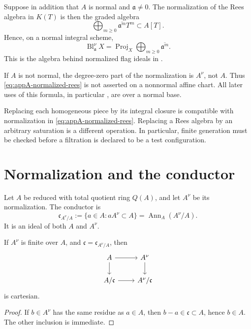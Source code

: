 Suppose in addition that \(A\) is normal and \(\mathfrak a\ne0\).
The normalization of the Rees
algebra in \(K(T)\) is then the graded algebra
\[
 \bigoplus_{m\geq0}\overline{\mathfrak a^m}T^m
 \subset A[T].
\]
Hence, on a normal integral scheme,
\[
 \operatorname{Bl}_{\mathfrak a}^{\nu}X
 =\operatorname{Proj}_X
   \bigoplus_{m\geq0}\overline{\mathfrak a^m}.
\tag{A.5}\label{eq:appA-normalized-rees}
\]
This is the algebra behind normalized flag ideals in
.

If \(A\) is not normal, the degree-zero part of the normalization is
\(A^\nu\), not \(A\).  Thus \eqref{eq:appA-normalized-rees} is not asserted
on a nonnormal affine chart.  All later uses of this formula, in particular
, are over a normal base.

\begin{remark}[Checkpoint]
\label{rem:appA-normalization-versus-saturation}
Replacing each homogeneous piece by its integral closure is compatible
with normalization in \eqref{eq:appA-normalized-rees}.  Replacing a Rees
algebra by an arbitrary saturation is a different operation.  In
particular, finite generation must be checked before a filtration is
declared to be a test configuration.
\end{remark}

\section{Normalization and the conductor}
\label{sec:appA-normalization-conductor}

Let \(A\) be reduced with total quotient ring \(Q(A)\), and let \(A^\nu\)
be its normalization.  The conductor is
\[
 \mathfrak c_{A^\nu/A}
 :=\{a\in A:aA^\nu\subset A\}
 =\operatorname{Ann}_A(A^\nu/A).
\tag{A.6}\label{eq:appA-conductor}
\]
It is an ideal of both \(A\) and \(A^\nu\).

\begin{lemma}\label{lem:appA-conductor-square}
If \(A^\nu\) is finite over \(A\), and
\(\mathfrak c=\mathfrak c_{A^\nu/A}\), then
\[
\begin{tikzcd}
A \arrow[r] \arrow[d] &
A^\nu \arrow[d]\\
A/\mathfrak c \arrow[r] &
A^\nu/\mathfrak c
\end{tikzcd}
\]
is cartesian.
\end{lemma}

\begin{proof}
If \(b\in A^\nu\) has the same residue as \(a\in A\), then
\(b-a\in\mathfrak c\subset A\), hence \(b\in A\).  The other inclusion is
immediate.
\end{proof}

